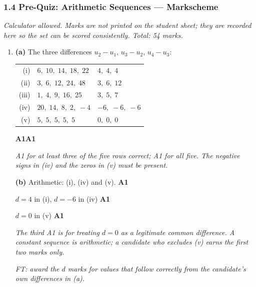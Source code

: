 \documentclass[12pt, twoside]{article}
\begin{document}
\subsubsection*{1.4 Pre-Quiz: Arithmetic Sequences --- Markscheme}

\emph{Calculator allowed. Marks are not printed on the student sheet; they are
recorded here so the set can be scored consistently. Total: 54 marks.}

\begin{enumerate}[itemsep=0.3cm]

\item[1.] [Maximum mark: 9]

\medskip

\textbf{(a)} The three differences $u_{2} - u_{1}$, $u_{3} - u_{2}$,
$u_{4} - u_{3}$:

\begin{center}
\begin{tabular}{rll}
(i) & $6,\; 10,\; 14,\; 18,\; 22$ & $4,\; 4,\; 4$ \\
(ii) & $3,\; 6,\; 12,\; 24,\; 48$ & $3,\; 6,\; 12$ \\
(iii) & $1,\; 4,\; 9,\; 16,\; 25$ & $3,\; 5,\; 7$ \\
(iv) & $20,\; 14,\; 8,\; 2,\; -4$ & $-6,\; -6,\; -6$ \\
(v) & $5,\; 5,\; 5,\; 5,\; 5$ & $0,\; 0,\; 0$ \\
\end{tabular}
\end{center}
\hfill \textbf{A1A1}

\emph{A1 for at least three of the five rows correct; A1 for all five. The
negative signs in (iv) and the zeros in (v) must be present.}

\medskip

\textbf{(b)} Arithmetic: (i), (iv) and (v). \hfill \textbf{A1}

$d = 4$ in (i), $d = -6$ in (iv) \hfill \textbf{A1}

$d = 0$ in (v) \hfill \textbf{A1}

\emph{The third A1 is for treating $d = 0$ as a legitimate common difference.
A constant sequence is arithmetic; a candidate who excludes (v) earns the
first two marks only.}

\emph{FT: award the $d$ marks for values that follow correctly from the
candidate's own differences in (a).}

\medskip


\end{enumerate}
\end{document}
